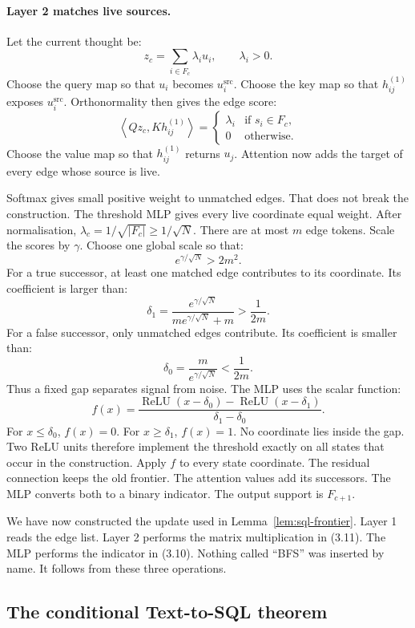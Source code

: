 \documentclass[11pt]{article}
\theoremstyle{definition}
\begin{document}
\paragraph{Layer 2 matches live sources.} Let the current thought be:
\[
z_c=\sum_{i\in F_c}\lambda_i u_i,
\qquad \lambda_i>0.
\tag{3.15}
\]
Choose the query map so that $u_i$ becomes $u_i^{\mathrm{src}}$. Choose the key map so that $h_{ij}^{(1)}$ exposes $u_i^{\mathrm{src}}$. Orthonormality then gives the edge score:
\[
\left\langle Qz_c,Kh_{ij}^{(1)}\right\rangle
=\begin{cases}
\lambda_i & \text{if }s_i\in F_c,\\
0 & \text{otherwise.}
\end{cases}
\tag{3.16}
\]
Choose the value map so that $h_{ij}^{(1)}$ returns $u_j$. Attention now adds the target of every edge whose source is live.

Softmax gives small positive weight to unmatched edges. That does not break the construction. The threshold MLP gives every live coordinate equal weight. After normalisation, $\lambda_c=1/\sqrt{|F_c|}\ge1/\sqrt N$. There are at most $m$ edge tokens. Scale the scores by $\gamma$. Choose one global scale so that:
\[
e^{\gamma/\sqrt N}>2m^2.
\tag{3.17a}
\]
For a true successor, at least one matched edge contributes to its coordinate. Its coefficient is larger than:
\[
\delta_1=\frac{e^{\gamma/\sqrt N}}
{m e^{\gamma/\sqrt N}+m}>\frac{1}{2m}.
\tag{3.17b}
\]
For a false successor, only unmatched edges contribute. Its coefficient is smaller than:
\[
\delta_0=\frac{m}{e^{\gamma/\sqrt N}}<\frac{1}{2m}.
\tag{3.17c}
\]
Thus a fixed gap separates signal from noise. The MLP uses the scalar function:
\[
f(x)=
\frac{\operatorname{ReLU}(x-\delta_0)
-\operatorname{ReLU}(x-\delta_1)}
{\delta_1-\delta_0}.
\tag{3.17d}
\]
For $x\le\delta_0$, $f(x)=0$. For $x\ge\delta_1$, $f(x)=1$. No coordinate lies inside the gap. Two ReLU units therefore implement the threshold exactly on all states that occur in the construction. Apply $f$ to every state coordinate. The residual connection keeps the old frontier. The attention values add its successors. The MLP converts both to a binary indicator. The output support is $F_{c+1}$.

We have now constructed the update used in Lemma~\ref{lem:sql-frontier}. Layer 1 reads the edge list. Layer 2 performs the matrix multiplication in (3.11). The MLP performs the indicator in (3.10). Nothing called ``BFS'' was inserted by name. It follows from these three operations.

\subsection{The conditional Text-to-SQL theorem}
\end{document}
